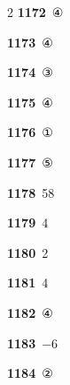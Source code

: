 \documentclass[10pt,a4paper]{article}
\begin{document}
\begin{multicols}{2}
\noindent\textbf{1172}\ ④\par
\noindent\textbf{1173}\ ④\par
\noindent\textbf{1174}\ ③\par
\noindent\textbf{1175}\ ④\par
\noindent\textbf{1176}\ ①\par
\noindent\textbf{1177}\ ⑤\par
\noindent\textbf{1178}\ 58\par
\noindent\textbf{1179}\ 4\par
\noindent\textbf{1180}\ 2\par
\noindent\textbf{1181}\ 4\par
\noindent\textbf{1182}\ ④\par
\noindent\textbf{1183}\ $-6$\par
\noindent\textbf{1184}\ ②\par
\end{multicols}
\end{document}
